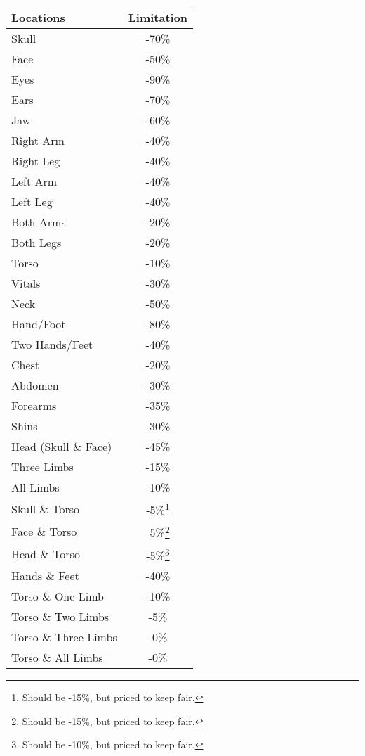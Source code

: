 \begin{multicols*}{3}
	\begin{center}
		\begin{tabularx}{0.32\textwidth}{|X|c|}
			\hline
			Locations & Limitation \\
			\hline
			\hline 
			Skull	& -70\%	\\
			Face 	& -50\%	\\	
			Eyes 	& -90\%	\\
			Ears 	& -70\%	\\
			Jaw		& -60\% \\
			Right Arm & -40\% \\
			Right Leg & -40\% \\
			Left Arm & -40\% \\
			Left Leg & -40\% \\
			Both Arms & -20\% \\
			Both Legs & -20\% \\
			Torso & -10\% \\
			Vitals & -30\% \\
			Neck & -50\% \\
			Hand/Foot & -80\% \\
			Two Hands/Feet & -40\% \\
			\hline
			Chest & -20\% \\
			Abdomen & -30\% \\
			Forearms & -35\% \\
			Shins & -30\% \\ 
			\hline
			Head (Skull \& Face) & -45\% \\
			Three Limbs & -15\% \\
			All Limbs & -10\% \\
			Skull \& Torso & -5\%\footnote{Should be -15\%, but priced to keep fair.} \\
			Face \& Torso & -5\%\footnote{Should be -15\%, but priced to keep fair.}  \\
			Head \& Torso & -5\%\footnote{Should be -10\%, but priced to keep fair.} \\
			Hands \& Feet & -40\% \\
			Torso \& One Limb & -10\% \\
			Torso \& Two Limbs & -5\% \\
			Torso \& Three Limbs & -0\% \\
			Torso \& All Limbs & -0\% \\
			\hline
		\end{tabularx}
	\end{center}	
	

\end{multicols*}
